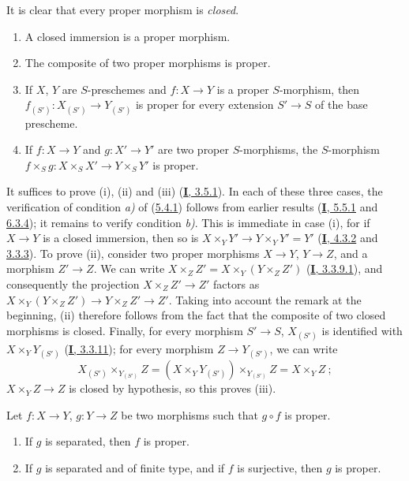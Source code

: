It is clear that every proper morphism is \emph{closed}.

\begin{proposition}[5.4.2]
\label{II.5.4.2}
\begin{enumerate}
  \item[\rm{(i)}] A closed immersion is a proper morphism.
  \item[\rm{(ii)}] The composite of two proper morphisms is proper.
  \item[\rm{(iii)}] If $X$, $Y$ are $S$-preschemes and
  $f:X\to Y$ is a proper $S$-morphism, then
  $f_{(S')}:X_{(S')}\to Y_{(S')}$ is proper for every extension
  $S'\to S$ of the base prescheme.
  \item[\rm{(iv)}] If $f:X\to Y$ and $g:X'\to Y'$ are two proper
  $S$-morphisms, the $S$-morphism
  $f\times_Sg:X\times_SX'\to Y\times_SY'$ is proper.
\end{enumerate}
\end{proposition}


It suffices to prove (i), (ii) and (iii) (\hyperref[I.3.5.1]{\textbf{I}, 3.5.1}).
In each of these three cases, the verification of condition \emph{a)} of
(\hyperref[II.5.4.1]{5.4.1}) follows from earlier results
(\hyperref[I.5.5.1]{\textbf{I}, 5.5.1} and \hyperref[I.6.3.4]{6.3.4}); it remains to
verify condition \emph{b)}. This is immediate in case (i), for if $X\to Y$
is a closed immersion, then so is
$X\times_YY'\to Y\times_YY'=Y'$ (\hyperref[I.4.3.2]{\textbf{I}, 4.3.2} and
\hyperref[II.3.3.3]{3.3.3}). To prove (ii), consider two
proper morphisms $X\to Y$, $Y\to Z$, and a morphism $Z'\to Z$. We can
write $X\times_ZZ'=X\times_Y(Y\times_ZZ')$
(\hyperref[I.3.3.9.1]{\textbf{I}, 3.3.9.1}), and consequently the projection
$X\times_ZZ'\to Z'$ factors as
$X\times_Y(Y\times_ZZ')\to Y\times_ZZ'\to Z'$. Taking into account the remark
at the beginning, (ii) therefore follows from the fact that the composite of
two closed morphisms is closed. Finally, for every morphism $S'\to S$,
$X_{(S')}$ is identified with
$X\times_YY_{(S')}$ (\hyperref[I.3.3.11]{\textbf{I}, 3.3.11}); for every
morphism $Z\to Y_{(S')}$, we can write
\[
  X_{(S')}\times_{Y_{(S')}}Z
  =(X\times_YY_{(S')})\times_{Y_{(S')}}Z=X\times_YZ~;
\]
$X\times_YZ\to Z$ is closed by hypothesis, so this proves (iii).

\begin{corollary}[5.4.3]
\label{II.5.4.3}
Let $f:X\to Y$, $g:Y\to Z$ be two morphisms such that $g\circ f$ is
proper.
\begin{enumerate}
  \item[\rm{(i)}] If $g$ is separated, then $f$ is proper.
  \item[\rm{(ii)}] If $g$ is separated and of finite type, and if $f$ is
  surjective, then $g$ is proper.
\end{enumerate}
\end{corollary}

